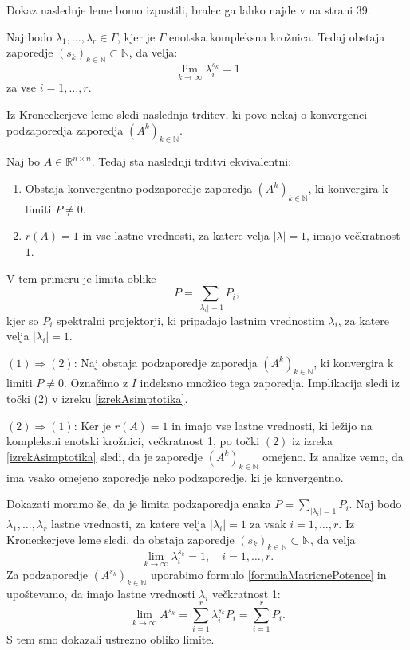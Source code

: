 \documentclass[mat1]{fmfdelo}
\newcommand{\R}{\mathbb R}
\newcommand{\N}{\mathbb N}
\begin{document}
Dokaz naslednje leme bomo izpustili, bralec ga lahko najde v \cite{kramar} na strani 39.
\begin{lema}[Kronecker]
    Naj bodo $\lambda_1, \ldots, \lambda_r \in \Gamma$, kjer je $\Gamma$ enotska kompleksna krožnica. Tedaj obstaja zaporedje $(s_k)_{k\in\N} \subset \N$, da velja:
    \begin{equation*}
        \lim_{k \rightarrow \infty} \lambda_i^{s_k} = 1
    \end{equation*}
    za vse $i = 1, \ldots, r$.
\end{lema}
Iz Kroneckerjeve leme sledi naslednja trditev, ki pove nekaj o konvergenci podzaporedja zaporedja $(A^k)_{k\in\N}$.
\begin{izrek}\label{izrek310}
    Naj bo $A \in \R^{n \times n}$. Tedaj sta naslednji trditvi ekvivalentni:
    \begin{enumerate}
        \item Obstaja konvergentno podzaporedje zaporedja $(A^k)_{k\in\N}$, ki konvergira k limiti $P \neq 0$.
        \item $r(A) = 1$ in vse lastne vrednosti, za katere velja $|\lambda| = 1$, imajo večkratnost $1$.
    \end{enumerate}
    V tem primeru je limita oblike
    \begin{equation*}
        P = \sum_{|\lambda_i| = 1} P_i,
    \end{equation*}
    kjer so $P_i$ spektralni projektorji, ki pripadajo lastnim vrednostim $\lambda_i$, za katere velja $|\lambda_i| = 1$.
\end{izrek}
\begin{dokaz}
    $(1) \Rightarrow (2)$: Naj obstaja podzaporedje zaporedja $(A^k)_{k\in\N}$, ki konvergira k limiti $P \neq 0$. Označimo z $I$ indeksno množico tega zaporedja. Implikacija sledi iz točki (2) v izreku \ref{izrekAsimptotika}.

    \noindent $(2) \Rightarrow (1)$: Ker je $r(A) = 1$ in imajo vse lastne vrednosti, ki ležijo na kompleksni enotski krožnici, večkratnost 1, po točki $(2)$ iz izreka \ref{izrekAsimptotika} sledi, da je zaporedje $(A^k)_{k\in\N}$ omejeno. Iz analize vemo, da ima vsako omejeno zaporedje neko podzaporedje, ki je konvergentno.

    Dokazati moramo še, da je limita podzaporedja enaka $P = \sum_{|\lambda_i| = 1} P_i$. Naj bodo $\lambda_1, \ldots, \lambda_r$ lastne vrednosti, za katere velja $|\lambda_i| = 1$ za vsak $i=1,\ldots,r$. Iz Kroneckerjeve leme sledi, da obstaja zaporedje $(s_k)_{k\in\N} \subset \N$, da velja
    \begin{equation*}
        \lim_{k \rightarrow \infty} \lambda_i^{s_k} = 1,\quad i=1,\ldots, r.
    \end{equation*}
    Za podzaporedje $(A^{s_k})_{k\in\N}$ uporabimo formulo \eqref{formulaMatricnePotence} in upoštevamo, da imajo lastne vrednosti $\lambda_i$ večkratnost 1:
    \begin{equation*}
        \lim_{k \rightarrow \infty} A^{s_k} = \sum_{i=1}^r \lambda_i^{s_k} P_i = \sum_{i=1}^r P_i.
    \end{equation*}
    S tem smo dokazali ustrezno obliko limite.
\end{dokaz}
\end{document}
